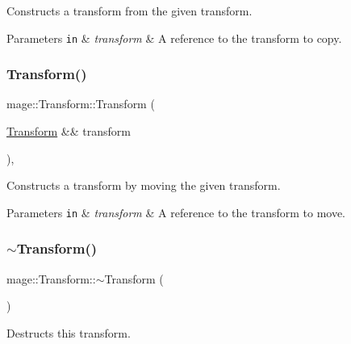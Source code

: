Constructs a transform from the given transform.


\begin{DoxyParams}[1]{Parameters}
\mbox{\tt in}  & {\em transform} & A reference to the transform to copy. \\
\hline
\end{DoxyParams}
\mbox{\label{classmage_1_1_transform_a0d1081071df89ee1ec2640774107f66c}} 
\subsubsection{\texorpdfstring{Transform()}{Transform()}\hspace{0.1cm}{\footnotesize\ttfamily [3/3]}}
{\footnotesize\ttfamily mage\+::\+Transform\+::\+Transform (\begin{DoxyParamCaption}\item[{\mbox{\hyperlink{classmage_1_1_transform}{Transform}} \&\&}]{transform }\end{DoxyParamCaption})\hspace{0.3cm}{\ttfamily [default]}, {\ttfamily [noexcept]}}

Constructs a transform by moving the given transform.


\begin{DoxyParams}[1]{Parameters}
\mbox{\tt in}  & {\em transform} & A reference to the transform to move. \\
\hline
\end{DoxyParams}
\mbox{\label{classmage_1_1_transform_a2da8c6542920e0748a504c32c54073f6}} 
\subsubsection{\texorpdfstring{$\sim$\+Transform()}{~Transform()}}
{\footnotesize\ttfamily mage\+::\+Transform\+::$\sim$\+Transform (\begin{DoxyParamCaption}{ }\end{DoxyParamCaption})\hspace{0.3cm}{\ttfamily [default]}}

Destructs this transform. 

